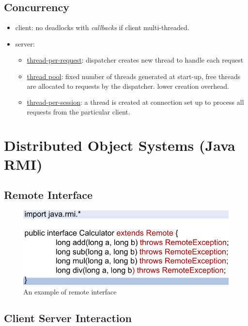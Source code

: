 \documentclass[twocolumn,landscape,10pt]{article}
\theoremstyle{definition}
\begin{document}
\subsection{Concurrency}

\begin{itemize}
    \item client: no deadlocks with \emph{callbacks} if client multi-threaded.
    \item server:
        \begin{itemize}
            \item \underline{thread-per-request}: dispatcher creates new thread to handle
                each request
            \item \underline{thread pool}: fixed number of threads generated at start-up,
                free threads are allocated to requests by the dispatcher. lower
                creation overhead.
            \item \underline{thread-per-session}: a thread is created at connection set up
                to process all requests from the particular client.
        \end{itemize} 
\end{itemize} 


\section{Distributed Object Systems (Java RMI)}

\subsection{Remote Interface}

\begin{figure}[!bh]
  	\includegraphics[scale=0.32]{RMI_interface.png}
  	\centering
    \caption{An example of remote interface}
\end{figure}

\subsection{Client Server Interaction}
\end{document}
